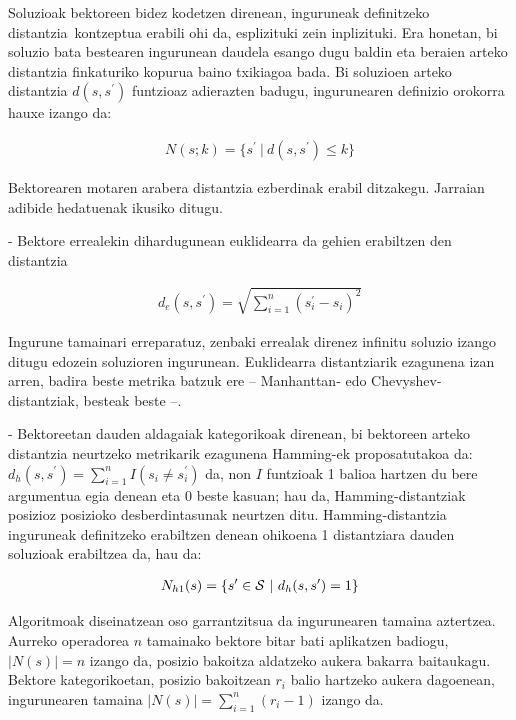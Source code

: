 \documentclass[eu]{ifirak}\usepackage[]{graphicx}\usepackage[]{color}
\newcommand{\zkk}{\guillemotleft}
\newcommand{\skk}{\guillemotright}
\begin{document}
Soluzioak bektoreen bidez kodetzen direnean, inguruneak definitzeko \zkk distantzia\skk\ kontzeptua erabili ohi da, esplizituki zein inplizituki. Era honetan, bi soluzio bata bestearen ingurunean daudela esango dugu baldin eta beraien arteko distantzia finkaturiko kopurua baino txikiagoa bada. Bi soluzioen arteko distantzia $d(s,s^\prime)$ funtzioaz adierazten badugu, ingurunearen definizio orokorra hauxe izango da:

\begin{align}
N(s;k) = \{s^\prime\ |\ d(s,s^\prime)\leq k\}
\end{align}

Bektorearen motaren arabera distantzia ezberdinak erabil ditzakegu. Jarraian adibide hedatuenak ikusiko ditugu.

 - Bektore errealekin dihardugunean euklidearra da gehien erabiltzen den distantzia

\begin{eqnarray*}
d_e(s,s^\prime) = \sqrt{\sum_{i=1}^n (s_i^\prime - s_i)^2}
\end{eqnarray*}


Ingurune tamainari erreparatuz, zenbaki errealak direnez infinitu soluzio izango ditugu edozein soluzioren ingurunean. Euklidearra distantziarik ezagunena izan arren, badira beste metrika batzuk ere -- Manhanttan- edo Chevyshev-distantziak, besteak beste --.

 - Bektoreetan dauden aldagaiak kategorikoak direnean, bi bektoreen arteko distantzia neurtzeko metrikarik ezagunena Hamming-ek proposatutakoa da: $d_h(s,s^\prime) = \sum_{i=1}^n I(s_i\neq s_i^\prime)$ da, non $I$ funtzioak 1 balioa hartzen du bere argumentua egia denean eta 0 beste kasuan; hau da, Hamming-distantziak posizioz posizioko desberdintasunak neurtzen ditu. Hamming-distantzia inguruneak definitzeko erabiltzen denean ohikoena 1 distantziara dauden soluzioak erabiltzea da, hau da:

\begin{align}\label{eq:hamming1_neigh}
N_{h1}(s) = \{s^\prime\in {\cal S}\ |\ d_h(s,s^\prime) = 1\}
\end{align}

Algoritmoak diseinatzean oso garrantzitsua da ingurunearen tamaina aztertzea. Aurreko operadorea $n$ tamainako bektore bitar bati aplikatzen badiogu, $|N(s)| = n$ izango da, posizio bakoitza aldatzeko aukera bakarra baitaukagu. Bektore kategorikoetan, posizio bakoitzean $r_i$ balio hartzeko aukera dagoenean, ingurunearen tamaina $|N(s)| = \sum_{i=1}^n (r_i - 1)$ izango da.
\end{document}
